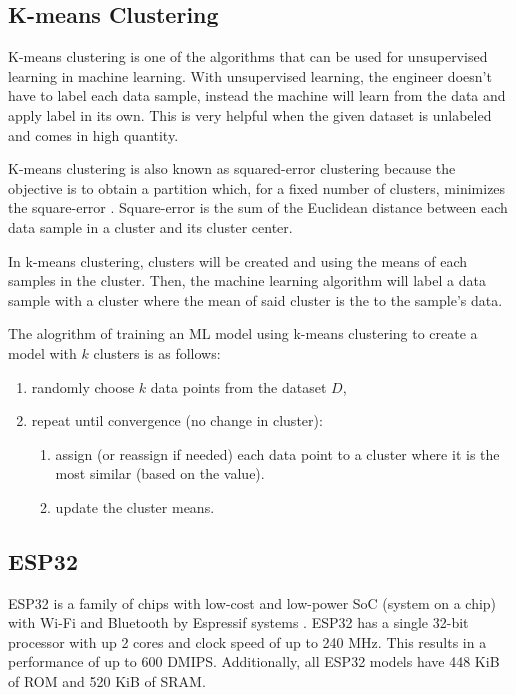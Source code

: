\subsection{K-means Clustering}

K-means clustering is one of the algorithms that can be used for
unsupervised learning in machine learning. With unsupervised learning,
the engineer doesn't have to label each data sample, instead the machine will
learn from the data and apply label in its own. This is very helpful when
the given dataset is unlabeled and comes in high quantity.

K-means clustering is also known as squared-error clustering because the
objective is to obtain a partition which, for a fixed number of clusters,
minimizes the square-error \cite*{clustering_fariska}. Square-error is the sum
of the Euclidean distance between each data sample in a cluster and its cluster
center.

In k-means clustering, clusters will be created and using the means of each
samples in the cluster. Then, the machine learning algorithm will label a data
sample with a cluster where the mean of said cluster is the to the sample's
data.

The alogrithm of training an ML model using k-means clustering to create a model
with $k$ clusters is as follows\cite{clustering_fariska}:
\begin{enumerate}
	\item randomly choose $k$ data points from the dataset $D$,
	\item repeat until convergence (no change in cluster):
	      \begin{enumerate}
		      \item assign (or reassign if needed) each data point to a cluster
		            where it is the most similar (based on the value).
		      \item update the cluster means.
	      \end{enumerate}
\end{enumerate}

\subsection{ESP32}

ESP32 is a family of chips with low-cost and low-power SoC (system on a chip)
with Wi-Fi and Bluetooth by Espressif systems \cite{esp32_net}. ESP32 has a single
32-bit processor with up 2 cores and clock speed of up to 240 MHz. This results
in a performance of up to 600 DMIPS. Additionally, all ESP32 models have 448 KiB
of ROM and 520 KiB of SRAM\cite{esp32_datasheet}.

